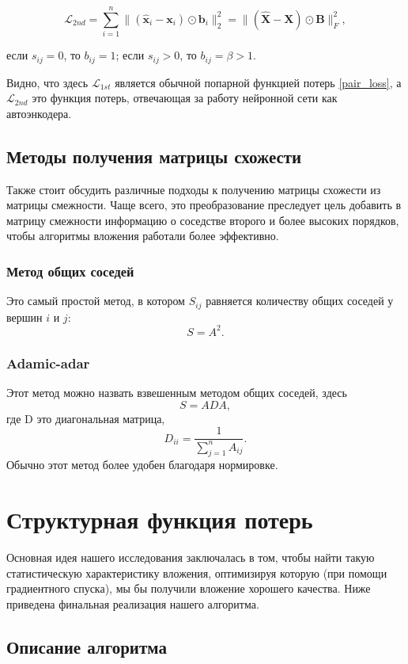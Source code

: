 \documentclass[12pt,a4paper]{extarticle}
\newcommand{\Loss}{\mathcal{L}}
\begin{document}
    $$
    \Loss_{2nd} = \sum_{i=1}^{n} \lVert (\mathbf{\hat{x}}_i - \mathbf{x}_i) \odot \mathbf{b}_i \rVert_2^2 = \lVert (\mathbf{\hat{X}} - \mathbf{X}) \odot \mathbf{B} \rVert^2_F,
    $$
    
    если $s_{ij} = 0$, то $b_{ij} = 1$; если $s_{ij} > 0$, то $b_{ij} = \beta > 1$.
    
    Видно, что здесь $\Loss_{1st}$ является обычной попарной функцией потерь \eqref{pair_loss}, а $\Loss_{2nd}$ это функция потерь, отвечающая за работу нейронной сети как автоэнкодера.

    
    \subsection{Методы получения матрицы схожести}
    Также стоит обсудить различные подходы к получению матрицы схожести из матрицы смежности.
    Чаще всего, это преобразование преследует цель добавить в матрицу смежности информацию о соседстве второго и более высоких порядков, чтобы алгоритмы вложения работали более эффективно.
    \subsubsection{Метод общих соседей}
    Это самый простой метод, в котором $S_{ij}$ равняется количеству общих соседей у вершин $i$ и $j$:
    \[S = A^2.\]
    \subsubsection{Adamic-adar}
    Этот метод можно назвать взвешенным методом общих соседей, здесь
    \[S = A D A,\]
    где D это диагональная матрица,
    \[D_{ii} = \frac{1}{\sum_{j=1}^n A_{ij}}.\]
    Обычно этот метод более удобен благодаря нормировке.
    
    \section{Структурная функция потерь}
    
    Основная идея нашего исследования заключалась в том, чтобы найти такую статистическую характеристику вложения, оптимизируя которую (при помощи градиентного спуска), мы бы получили вложение хорошего качества.
    Ниже приведена финальная реализация нашего алгоритма.
    
    \subsection{Описание алгоритма}
    
\end{document}
